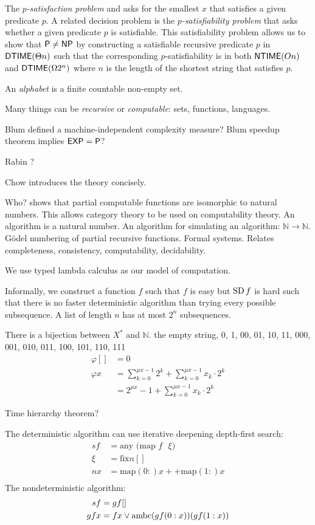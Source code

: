 The \emph{$p$-satisfaction problem}
and asks for the smallest $x$ that satisfies a given predicate $p$.
A related decision problem is the \emph{$p$-satisfiability problem} that
asks whether a given predicate $p$ is satisfiable.
This satisfiability problem allows us to show that $\mathsf{P} \neq \mathsf{NP}$
by constructing a satisfiable recursive predicate
$p$ in $\operatorname{\mathsf{DTIME}}(\Theta n)$ such that
the corresponding $p$-satisfiability is in both $\operatorname{\mathsf{NTIME}}(On)$ and $\operatorname{\mathsf{DTIME}}(\Omega 2^n)$
where $n$ is the length of the shortest string that satisfies $p$.

An \emph{alphabet} is a finite countable non-empty set.

Many things can be \emph{recursive} or \emph{computable}: sets, functions, languages.

Blum \cite{Blum1967} defined a machine-independent complexity measure?
Blum speedup theorem implies $\mathsf{EXP} = \mathsf{P}$?

Rabin \cite{Rabin1977}?

Chow \cite{Chow1976} introduces the theory concisely.

Who? shows that partial computable functions are isomorphic to natural numbers.
This allows category theory to be used on computability theory.
An algorithm is a natural number.
An algorithm for simulating an algorithm: $\mathbb N \to \mathbb N$.
G\"odel numbering of partial recursive functions.
Formal systems.
Relates completeness, consistency, computability, decidability.

We use typed lambda calculus as our model of computation.

Informally, we construct a function $f$ such that $f$ is easy but $\operatorname{SD} f$ is hard
such that there is no faster deterministic algorithm
than trying every possible subsequence.
A list of length $n$ has at most $2^n$ subsequences.

There is a bijection between $X^*$ and $\mathbb N$.
the empty string, 0, 1, 00, 01, 10, 11, 000, 001, 010, 011, 100, 101, 110, 111
\begin{align}
    \varphi [] &= 0
  \\ \varphi x &= \sum_{k=0}^{\mu x - 1} 2^k + \sum_{k=0}^{\mu x - 1} x_k \cdot 2^k
            \\ &= 2^{\mu x} - 1 + \sum_{k=0}^{\mu x - 1} x_k \cdot 2^k
\end{align}

Time hierarchy theorem?

The deterministic algorithm can use iterative deepening depth-first search:
\begin{align}
    sf &= \text{any $($map $f$ $\xi)$}
    \\
    \xi &= \text{fix} n []
    \\
    nx &= \text{map} (0:) x ++ \text{map} (1:) x
    \\
\end{align}
The nondeterministic algorithm:
\begin{align}
    sf &= gf[]
    \\
    gfx &= fx \vee \operatorname{ambc} (gf(0:x)) (gf(1:x))
\end{align}

